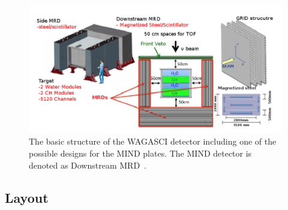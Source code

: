 
\begin{figure}[h!]
\centering
\includegraphics[width=\textwidth]{figures/WAGASCI.png}
\caption{The basic structure of the WAGASCI detector including one of the possible designs for the MIND plates. The MIND detector is denoted as Downstream MRD~\cite{30WAGASCI}.}
\label{fig:WAGASCI}
\end{figure}

\subsection{Layout}


